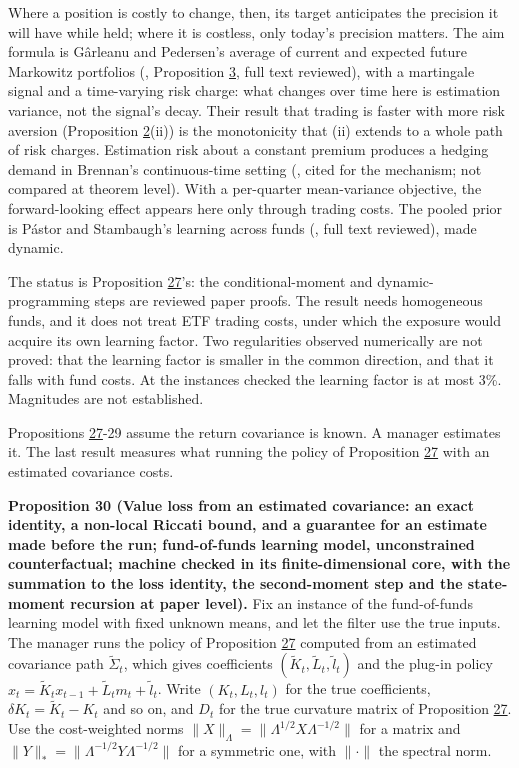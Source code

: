 \documentclass[11pt]{article}
\begin{document}
Where a position is costly to change, then, its target anticipates
the precision it will have while held; where it is costless, only
today's precision matters. The aim formula is Gârleanu and Pedersen's
average of current and expected future Markowitz portfolios
(\cite{garleanu2009dynamic}, Proposition \hyperref[res:Proposition-3]{3}, full text reviewed), with a
martingale signal and a time-varying risk charge: what changes over
time here is estimation variance, not the signal's decay. Their
result that trading is faster with more risk aversion (Proposition \hyperref[res:Proposition-2]{2}(ii))
is the monotonicity that (ii) extends to a whole path of risk charges.
Estimation risk about a constant premium produces a hedging demand in
Brennan's continuous-time setting (\cite{brennan1998role}, cited for the
mechanism; not compared at theorem level). With a per-quarter
mean-variance objective, the forward-looking effect appears here only
through trading costs. The pooled prior is Pástor and Stambaugh's
learning across funds (\cite{pastor2002investing}, full text reviewed),
made dynamic.

The status is Proposition \hyperref[res:Proposition-27]{27}'s: the conditional-moment and
dynamic-programming steps are reviewed paper proofs. The result needs
homogeneous funds, and it does not treat ETF trading costs, under
which the exposure would acquire its own learning factor. Two
regularities observed numerically are not proved: that the learning
factor is smaller in the common direction, and that it falls with
fund costs. At the instances checked the learning factor is at most
3\%. Magnitudes are not established.

Propositions \hyperref[res:Proposition-27]{27}-29 assume the return covariance is known. A manager
estimates it. The last result measures what running the policy of
Proposition \hyperref[res:Proposition-27]{27} with an estimated covariance costs.

\label{res:Proposition-30}
\textbf{Proposition 30 (Value loss from an estimated covariance: an exact identity, a non-local Riccati bound, and a guarantee for an estimate made before the run; fund-of-funds learning model, unconstrained counterfactual; machine checked in its finite-dimensional core, with the summation to the loss identity, the second-moment step and the state-moment recursion at paper level).}
Fix an instance of the fund-of-funds learning model with fixed
unknown means, and let the filter use the true inputs. The manager
runs the policy of Proposition \hyperref[res:Proposition-27]{27} computed from an estimated
covariance path \(\tilde\Sigma_t\), which gives coefficients
\((\tilde K_t,\tilde L_t,\tilde l_t)\) and the plug-in policy
\(x_t=\tilde K_tx_{t-1}+\tilde L_tm_t+\tilde l_t\). Write \((K_t,L_t,l_t)\) for
the true coefficients, \(\delta K_t=\tilde K_t-K_t\) and so on, and \(D_t\) for
the true curvature matrix of Proposition \hyperref[res:Proposition-27]{27}. Use the cost-weighted
norms \(\|X\|_\Lambda=\|\Lambda^{1/2}X\Lambda^{-1/2}\|\) for a matrix and
\(\|Y\|_*=\|\Lambda^{-1/2}Y\Lambda^{-1/2}\|\) for a symmetric one, with
\(\|\cdot\|\) the spectral norm.
\end{document}
